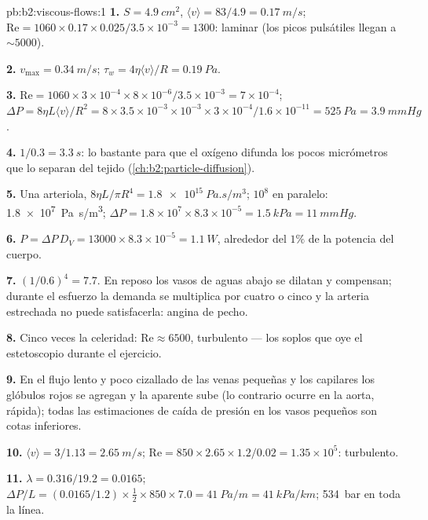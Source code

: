 \begin{solution}{pb:b2:viscous-flows:1}
\textbf{1.} $S = \qty{4.9}{cm^2}$, $\langle v\rangle = 83/4.9 = \qty{0.17}{m/s}$; $\mathrm{Re}
= 1060 \times 0.17 \times 0.025/3.5 \times 10^{-3} = 1300$: laminar (los picos
pulsátiles llegan a $\sim 5000$).

\textbf{2.} $v_{\max} = \qty{0.34}{m/s}$; $\tau_w = 4\eta\langle v\rangle/R = \qty{0.19}{Pa}$.

\textbf{3.} $\mathrm{Re} = 1060 \times 3 \times 10^{-4} \times 8 \times 10^{-6}/3.5 \times 10^{-3} =
7 \times 10^{-4}$; $\Delta P = 8\eta L\langle v\rangle/R^2 = 8 \times 3.5 \times 10^{-3} \times 10^{-3}
\times 3 \times 10^{-4}/1.6 \times 10^{-11} = \qty{525}{Pa} = \qty{3.9}{mmHg}$.

\textbf{4.} $1/0.3 = \qty{3.3}{s}$: lo bastante para que el oxígeno difunda
los pocos micrómetros que lo separan del tejido
(\cref{ch:b2:particle-diffusion}).

\textbf{5.} Una arteriola, $8\eta L/\pi R^4 = \qty{1.8e15}{Pa.s/m^3}$; $10^8$ en
paralelo: \qty{1.8e7}{Pa.s/m^3}; $\Delta P = 1.8 \times 10^7 \times 8.3 \times 10^{-5} =
\qty{1.5}{kPa} = \qty{11}{mmHg}$.

\textbf{6.} $P = \Delta P\,D_V = 13000 \times 8.3 \times 10^{-5} = \qty{1.1}{W}$, alrededor
del $1\%$ de la potencia del cuerpo.

\textbf{7.} $(1/0.6)^4 = 7.7$. En reposo los vasos de aguas abajo se dilatan
y compensan; durante el esfuerzo la demanda se multiplica por cuatro o
cinco y la arteria estrechada no puede satisfacerla: angina de pecho.

\textbf{8.} Cinco veces la celeridad: $\mathrm{Re} \approx 6500$, turbulento --- los
soplos que oye el estetoscopio durante el ejercicio.

\textbf{9.} En el flujo lento y poco cizallado de las venas pequeñas y los
capilares los glóbulos rojos se agregan y la  aparente sube (lo
contrario ocurre en la aorta, rápida); todas las estimaciones de caída de
presión en los vasos pequeños son cotas inferiores.

\textbf{10.} $\langle v\rangle = 3/1.13 = \qty{2.65}{m/s}$; $\mathrm{Re} = 850 \times 2.65 \times
1.2/0.02 = 1.35 \times 10^5$: turbulento.

\textbf{11.} $\lambda = 0.316/19.2 = 0.0165$; $\Delta P/L = (0.0165/1.2) \times \tfrac12 \times
850 \times 7.0 = \qty{41}{Pa/m} = \qty{41}{kPa/km}$; \qty{534}{bar} en toda la línea.


\end{solution}
